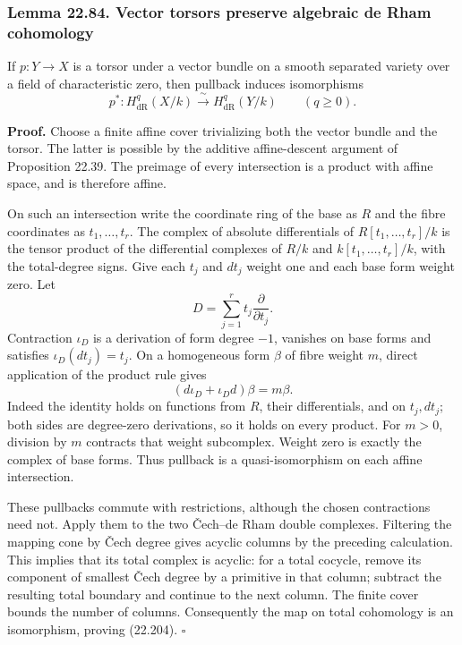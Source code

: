 \documentclass[
  11pt,
  a4paper,
]{article}
\begin{document}
\subsubsection{Lemma 22.84. Vector torsors preserve algebraic de Rham
cohomology}\label{lemma-22.84.-vector-torsors-preserve-algebraic-de-rham-cohomology}

If \(p:Y\to X\) is a torsor under a vector bundle on a smooth separated
variety over a field of characteristic zero, then pullback induces
isomorphisms \[
 p^*:H^q_{\mathrm{dR}}(X/k)\xrightarrow{\;\sim\;}
       H^q_{\mathrm{dR}}(Y/k)\qquad(q\ge0).
 \tag{22.204}
\]

\textbf{Proof.} Choose a finite affine cover trivializing both the
vector bundle and the torsor. The latter is possible by the additive
affine-descent argument of Proposition 22.39. The preimage of every
intersection is a product with affine space, and is therefore affine.

On such an intersection write the coordinate ring of the base as \(R\)
and the fibre coordinates as \(t_1,\ldots,t_r\). The complex of absolute
differentials of \(R[t_1,\ldots,t_r]/k\) is the tensor product of the
differential complexes of \(R/k\) and \(k[t_1,\ldots,t_r]/k\), with the
total-degree signs. Give each \(t_j\) and \(dt_j\) weight one and each
base form weight zero. Let \[
 D=\sum_{j=1}^r t_j\frac{\partial}{\partial t_j}.
\] Contraction \(\iota_D\) is a derivation of form degree \(-1\),
vanishes on base forms and satisfies \(\iota_D(dt_j)=t_j\). On a
homogeneous form \(\beta\) of fibre weight \(m\), direct application of
the product rule gives \[
 (d\iota_D+\iota_Dd)\beta=m\beta.
 \tag{22.205}
\] Indeed the identity holds on functions from \(R\), their
differentials, and on \(t_j,dt_j\); both sides are degree-zero
derivations, so it holds on every product. For \(m>0\), division by
\(m\) contracts that weight subcomplex. Weight zero is exactly the
complex of base forms. Thus pullback is a quasi-isomorphism on each
affine intersection.

These pullbacks commute with restrictions, although the chosen
contractions need not. Apply them to the two Čech--de Rham double
complexes. Filtering the mapping cone by Čech degree gives acyclic
columns by the preceding calculation. This implies that its total
complex is acyclic: for a total cocycle, remove its component of
smallest Čech degree by a primitive in that column; subtract the
resulting total boundary and continue to the next column. The finite
cover bounds the number of columns. Consequently the map on total
cohomology is an isomorphism, proving (22.204). \(\square\)
\end{document}
